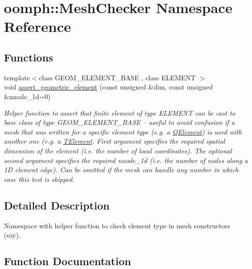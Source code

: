 \hypertarget{namespaceoomph_1_1MeshChecker}{}\section{oomph\+:\+:Mesh\+Checker Namespace Reference}
\label{namespaceoomph_1_1MeshChecker}
\subsection*{Functions}
\begin{DoxyCompactItemize}
\item 
{\footnotesize template$<$class G\+E\+O\+M\+\_\+\+E\+L\+E\+M\+E\+N\+T\+\_\+\+B\+A\+SE , class E\+L\+E\+M\+E\+NT $>$ }\\void \hyperlink{namespaceoomph_1_1MeshChecker_a8e9d9ec5a142aba10ec0f3beb9b61d43}{assert\+\_\+geometric\+\_\+element} (const unsigned \&dim, const unsigned \&nnode\+\_\+1d=0)
\begin{DoxyCompactList}\small\item\em Helper function to assert that finite element of type E\+L\+E\+M\+E\+NT can be cast to base class of type G\+E\+O\+M\+\_\+\+E\+L\+E\+M\+E\+N\+T\+\_\+\+B\+A\+SE -- useful to avoid confusion if a mesh that was written for a specific element type (e.\+g. a \hyperlink{classoomph_1_1QElement}{Q\+Element}) is used with another one (e.\+g. a \hyperlink{classoomph_1_1TElement}{T\+Element}. First argument specifies the required spatial dimension of the element (i.\+e. the number of local coordinates). The optional second argument specifies the required nnode\+\_\+1d (i.\+e. the number of nodes along a 1D element edge). Can be omitted if the mesh can handle any number in which case this test is skipped. \end{DoxyCompactList}\end{DoxyCompactItemize}


\subsection{Detailed Description}
Namespace with helper function to check element type in mesh constructors (say). 

\subsection{Function Documentation}
\mbox{\label{namespaceoomph_1_1MeshChecker_a8e9d9ec5a142aba10ec0f3beb9b61d43}} 
